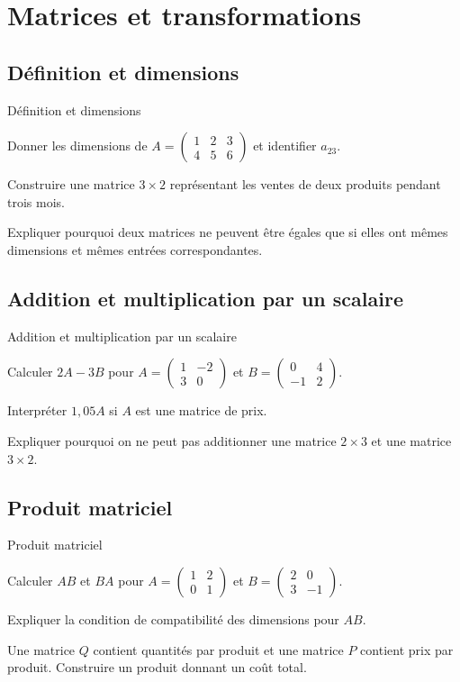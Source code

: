 \chapter{Matrices et transformations}
\label{workbook:chapter:11}
\section{Définition et dimensions}
\label{workbook:section:11.01}
\begin{exerciseblock}{Définition et dimensions}
\item Donner les dimensions de $A=\begin{pmatrix}1&2&3\\4&5&6\end{pmatrix}$ et identifier $a_{23}$.
\item Construire une matrice $3\times2$ représentant les ventes de deux produits pendant trois mois.
\item Expliquer pourquoi deux matrices ne peuvent être égales que si elles ont mêmes dimensions et mêmes entrées correspondantes.
\end{exerciseblock}
\section{Addition et multiplication par un scalaire}
\label{workbook:section:11.02}
\begin{exerciseblock}{Addition et multiplication par un scalaire}
\item Calculer $2A-3B$ pour $A=\begin{pmatrix}1&-2\\3&0\end{pmatrix}$ et $B=\begin{pmatrix}0&4\\-1&2\end{pmatrix}$.
\item Interpréter $1{,}05A$ si $A$ est une matrice de prix.
\item Expliquer pourquoi on ne peut pas additionner une matrice $2\times3$ et une matrice $3\times2$.
\end{exerciseblock}
\section{Produit matriciel}
\label{workbook:section:11.03}
\begin{exerciseblock}{Produit matriciel}
\item Calculer $AB$ et $BA$ pour $A=\begin{pmatrix}1&2\\0&1\end{pmatrix}$ et $B=\begin{pmatrix}2&0\\3&-1\end{pmatrix}$.
\item Expliquer la condition de compatibilité des dimensions pour $AB$.
\item Une matrice $Q$ contient quantités par produit et une matrice $P$ contient prix par produit. Construire un produit donnant un coût total.
\end{exerciseblock}
